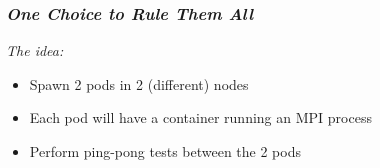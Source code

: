 \begin{frame}
  \frametitle{ \textit{One Choice to Rule Them All}}
  \vspace{.5em}
  \begin{block}{ \textit{The idea:}}
    \begin{itemize}
      \itemsep0em
      \item<1-> Spawn \alert{2 pods} in \alert{2 (different) nodes}
      \item<2-> Each pod will have a \alert{container} running an \alert{MPI
          process}
      \item<3-> Perform \alert{ping-pong} tests between the 2 pods 
    \end{itemize}
  \end{block}

  \begin{figure}
    \centering
  \end{figure}
\end{frame}


